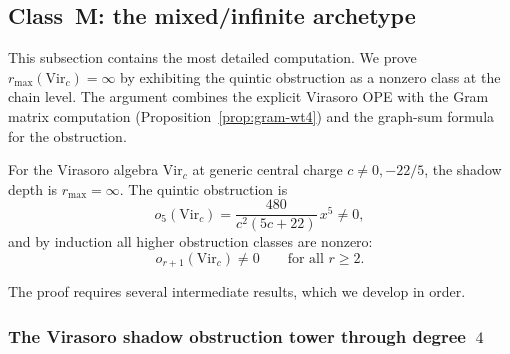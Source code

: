 
\subsection{Class~M: the mixed/infinite archetype}
\label{subsec:class-m-mixed}

This subsection contains the most detailed computation.
We prove $r_{\max}(\mathrm{Vir}_c) = \infty$ by
exhibiting the quintic obstruction as a nonzero class at
the chain level. The argument combines the explicit
Virasoro OPE with the Gram matrix computation
(Proposition~\ref{prop:gram-wt4}) and the graph-sum
formula for the obstruction.

\begin{theorem}[$r_{\max}(\mathrm{Vir}_c) = \infty$; \ClaimStatusProvedHere]
\label{thm:virasoro-rmax-infinity}
For the Virasoro algebra $\mathrm{Vir}_c$ at generic
central charge $c \neq 0, -22/5$, the shadow depth is
$r_{\max} = \infty$. The quintic obstruction is
\begin{equation}\label{eq:virasoro-quintic-nonzero}
o_5(\mathrm{Vir}_c) =
\frac{480}{c^2(5c+22)}\,x^5 \neq 0,
\end{equation}
and by induction all higher obstruction classes are
nonzero:
\begin{equation}\label{eq:virasoro-all-obstructions-nonzero}
o_{r+1}(\mathrm{Vir}_c) \neq 0
\qquad \text{for all } r \geq 2.
\end{equation}
\end{theorem}

The proof requires several intermediate results, which
we develop in order.

\subsubsection{The Virasoro shadow obstruction tower through degree~$4$}
\label{subsubsec:virasoro-tower-through-4}

